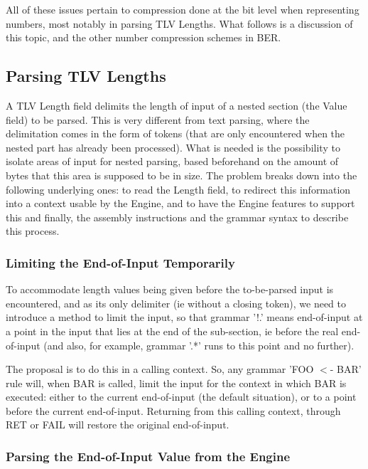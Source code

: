 All of these issues pertain to compression done at the bit level when 
representing numbers, most notably in parsing TLV Lengths. What follows is 
a discussion of this topic, and the other number compression schemes in 
BER.

\subsection{Parsing TLV Lengths}

A TLV Length field delimits the length of input of a nested section (the 
Value field) to be parsed. This is very different from text parsing, where 
the delimitation comes in the form of tokens (that are only encountered 
when the nested part has already been processed). What is needed is the 
possibility to isolate areas of input for nested parsing, based beforehand 
on the amount of bytes that this area is supposed to be in size. The 
problem breaks down into the following underlying ones: to read the Length 
field, to redirect this information into a context usable by the Engine, 
and to have the Engine features to support this and finally, the assembly 
instructions and the grammar syntax to describe this process.

\subsubsection{Limiting the End-of-Input Temporarily}

To accommodate length values being given before the to-be-parsed input is 
encountered, and as its only delimiter (ie without a closing token), we 
need to introduce a method to limit the input, so that grammar '!.' means 
end-of-input at a point in the input that lies at the end of the 
sub-section, ie before the real end-of-input (and also, for example, 
grammar '.*' runs to this point and no further).

The proposal is to do this in a calling context. So, any grammar 'FOO $<$- 
BAR' rule will, when BAR is called, limit the input for the context in 
which BAR is executed: either to the current end-of-input (the default 
situation), or to a point before the current end-of-input. Returning from 
this calling context, through RET or FAIL will restore the original 
end-of-input.

\subsubsection{Parsing the End-of-Input Value from the Engine}
\label{sec:work:tlv:eoi}

